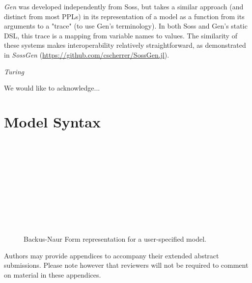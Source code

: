 \documentclass[anonymous=false, %
               format=acmsmall, %
               review=true, %
               screen=true, %
               nonacm=true]{acmart}
\begin{document}
\emph{Gen} \cite{Cusumano-Towner:2019} was developed independently from Soss, but takes a similar approach (and distinct from most PPLs) in its representation of a model as a function from its arguments to a "trace" (to use Gen's terminology). In both Soss and Gen's static DSL, this trace is a mapping from variable names to values. The similarity of these systems makes interoperability relatively straightforward, as demonstrated in \emph{SossGen} (\url{https://github.com/cscherrer/SossGen.jl}).

\emph{Turing} \cite{ge2018t}

\begin{acks}
We would like to acknowledge...
\end{acks}




\appendix

\section{Model Syntax}

\begin{figure}[!t]
  \centering
\begin{bnf*}
  \\
   \\
   \\ 
   \\
   \\
   \bnfsp {} \\
   \\
   \\ 
   \\
\end{bnf*}
  \caption{Backus-Naur Form representation for a user-specified model.}
  \label{fig:bnf}
\end{figure}


Authors may provide appendices to accompany their extended abstract submissions. Please note however that reviewers will not be required to comment on material in these appendices.
\end{document}
